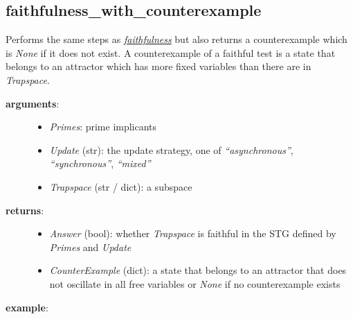 \documentclass[letterpaper,10pt,english]{sphinxmanual}
\begin{document}
\subsection{faithfulness\_with\_counterexample}
\label{AttractorDetection:faithfulness-with-counterexample}\label{AttractorDetection:id8}

\begin{fulllineitems}
\label{AttractorDetection:PyBoolNet.AttractorDetection.faithfulness_with_counterexample}
Performs the same steps as {\hyperref[AttractorDetection:faithfulness]{\emph{faithfulness}}} but also returns a counterexample which is \emph{None} if it does not exist.
A counterexample of a faithful test is a state that belongs to an attractor which has more fixed variables than there are in \emph{Trapspace}.
\begin{description}
\item[{\textbf{arguments}:}] \leavevmode\begin{itemize}
\item {} 
\emph{Primes}: prime implicants

\item {} 
\emph{Update} (str): the update strategy, one of \emph{``asynchronous''}, \emph{``synchronous''}, \emph{``mixed''}

\item {} 
\emph{Trapspace} (str / dict): a subspace

\end{itemize}

\item[{\textbf{returns}:}] \leavevmode\begin{itemize}
\item {} 
\emph{Answer} (bool): whether \emph{Trapspace} is faithful in the STG defined by \emph{Primes} and \emph{Update}

\item {} 
\emph{CounterExample} (dict): a state that belongs to an attractor that does not oscillate in all free variables or \emph{None} if no counterexample exists

\end{itemize}

\end{description}

\textbf{example}:


\end{fulllineitems}
\end{document}
